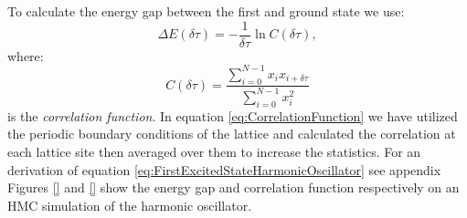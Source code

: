 \documentclass[12pt]{article}
\begin{document}
                To calculate the energy gap between the first and ground state  we use:
                \begin{equation}
                    \label{eq:FirstExcitedStateHarmonicOscillator}
                    \Delta E\left(\delta \tau\right) = -\frac{1}{\delta \tau} \ln C\left(\delta \tau\right),
                \end{equation}
                where:
                \begin{equation}
                    \label{eq:CorrelationFunction}
                    C\left(\delta\tau\right) = \frac{\sum_{i=0}^{N-1} x_{i}x_{i+\delta\tau}}{\sum_{i=0}^{N-1}x_i^2}
                \end{equation}
                is the \textit{correlation function}. In equation \ref{eq:CorrelationFunction} we have utilized the periodic boundary conditions of the lattice and calculated the correlation at each lattice site then averaged over them to increase the statistics. For an derivation of equation \ref{eq:FirstExcitedStateHarmonicOscillator} see appendix 
                Figures \ref{} and \ref{} show the energy gap and correlation function respectively on an HMC simulation of the harmonic oscillator.
\end{document}
